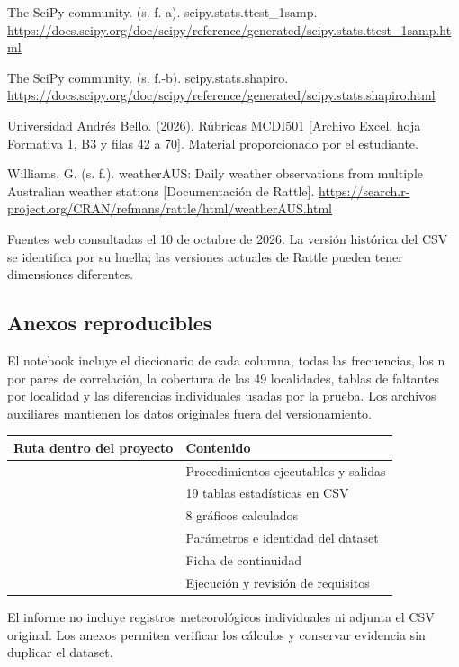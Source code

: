 \documentclass[11pt,a4paper]{article}
\begin{document}
The SciPy community. (s. f.-a). scipy.stats.ttest\_1samp. \url{https://docs.scipy.org/doc/scipy/reference/generated/scipy.stats.ttest_1samp.html}


The SciPy community. (s. f.-b). scipy.stats.shapiro. \url{https://docs.scipy.org/doc/scipy/reference/generated/scipy.stats.shapiro.html}


Universidad Andrés Bello. (2026). Rúbricas MCDI501 [Archivo Excel, hoja Formativa 1, B3 y filas 42 a 70]. Material proporcionado por el estudiante.


Williams, G. (s. f.). weatherAUS: Daily weather observations from multiple Australian weather stations [Documentación de Rattle]. \url{https://search.r-project.org/CRAN/refmans/rattle/html/weatherAUS.html}


{\small Fuentes web consultadas el 10 de octubre de 2026. La versión histórica del CSV se identifica por su huella; las versiones actuales de Rattle pueden tener dimensiones diferentes.\par}

\subsection{Anexos reproducibles}

El notebook incluye el diccionario de cada columna, todas las frecuencias, los n por pares de correlación, la cobertura de las 49 localidades, tablas de faltantes por localidad y las diferencias individuales usadas por la prueba. Los archivos auxiliares mantienen los datos originales fuera del versionamiento.


\begin{table}[H]
\centering
\small
\renewcommand{\arraystretch}{1.18}
\setlength{\tabcolsep}{5pt}
\begin{tabularx}{\linewidth}{@{}L{9.0cm}Y@{}}
\toprule

\textbf{Ruta dentro del proyecto} & \textbf{Contenido} \\
\midrule

 & Procedimientos ejecutables y salidas \\

 & 19 tablas estadísticas en CSV \\

 & 8 gráficos calculados \\

 & Parámetros e identidad del dataset \\

 & Ficha de continuidad \\

 & Ejecución y revisión de requisitos \\

\bottomrule
\end{tabularx}

\end{table}

El informe no incluye registros meteorológicos individuales ni adjunta el CSV original. Los anexos permiten verificar los cálculos y conservar evidencia sin duplicar el dataset.
\end{document}
